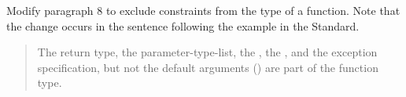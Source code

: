 Modify paragraph 8 to exclude constraints from the type of a function.
Note that the change occurs in the sentence following the example
in the \Cpp Standard.

\begin{quote}
\setcounter{Paras}{7}
\pnum
The return type, the parameter-type-list, the , 
the , and the exception specification, but not 
the default arguments ()
are part of the function type.
\end{quote}

